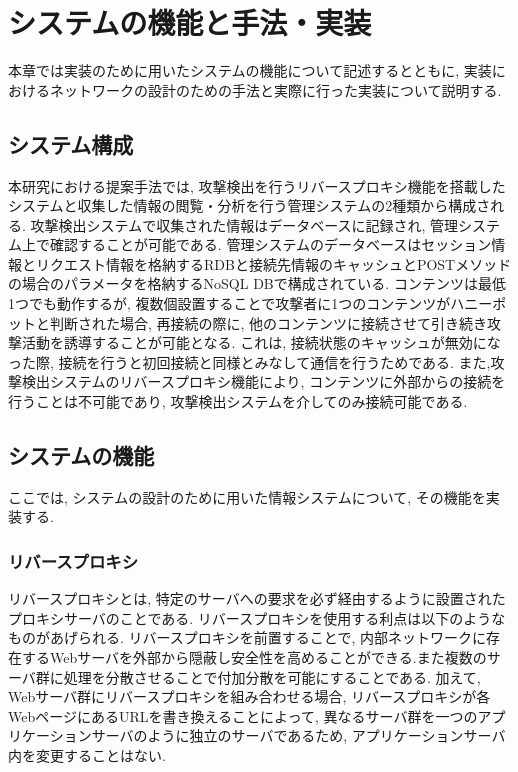 \documentclass[submit,techrep,noauthor]{ipsj}
\begin{document}
\section{システムの機能と手法・実装}
本章では実装のために用いたシステムの機能について記述するとともに, 実装におけるネットワークの設計のための手法と実際に行った実装について説明する.

\subsection{システム構成}
本研究における提案手法では, 攻撃検出を行うリバースプロキシ機能を搭載したシステムと収集した情報の閲覧・分析を行う管理システムの2種類から構成される. 攻撃検出システムで収集された情報はデータベースに記録され, 管理システム上で確認することが可能である. 管理システムのデータベースはセッション情報とリクエスト情報を格納するRDBと接続先情報のキャッシュとPOSTメソッドの場合のパラメータを格納するNoSQL DBで構成されている. コンテンツは最低1つでも動作するが, 複数個設置することで攻撃者に1つのコンテンツがハニーポットと判断された場合, 再接続の際に, 他のコンテンツに接続させて引き続き攻撃活動を誘導することが可能となる. これは, 接続状態のキャッシュが無効になった際, 接続を行うと初回接続と同様とみなして通信を行うためである. また,攻撃検出システムのリバースプロキシ機能により, コンテンツに外部からの接続を行うことは不可能であり, 攻撃検出システムを介してのみ接続可能である.

\subsection{システムの機能}
ここでは, システムの設計のために用いた情報システムについて, その機能を実装する.

\subsubsection{リバースプロキシ}
リバースプロキシとは, 特定のサーバへの要求を必ず経由するように設置されたプロキシサーバのことである. リバースプロキシを使用する利点は以下のようなものがあげられる.
リバースプロキシを前置することで, 内部ネットワークに存在するWebサーバを外部から隠蔽し安全性を高めることができる.また複数のサーバ群に処理を分散させることで付加分散を可能にすることである.
加えて, Webサーバ群にリバースプロキシを組み合わせる場合, リバースプロキシが各WebページにあるURLを書き換えることによって, 異なるサーバ群を一つのアプリケーションサーバのように独立のサーバであるため, アプリケーションサーバ内を変更することはない.
\end{document}
